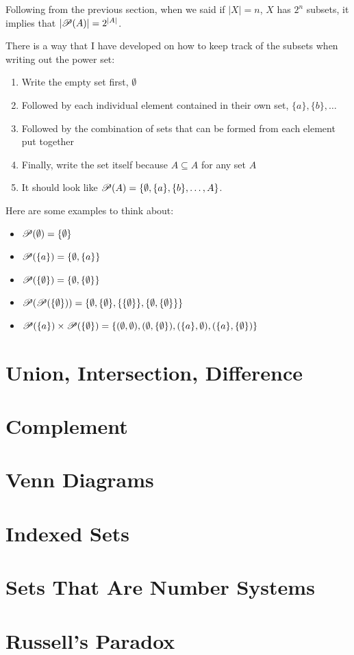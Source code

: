 \documentclass[../Latex-Setup/setup.tex]{subfiles}
\begin{document}
\indent Following from the previous section, when we said if $|X| = n$, $X$ has $2^n$ subsets,
it implies that $|\mathscr P(A)| = 2^{|A|}$.\par

\indent There is a way that I have developed on how to keep track of the subsets when writing out the power set:
\begin{enumerate}
    \item Write the empty set first, $\emptyset$
    \item Followed by each individual element contained in their own set, $\{a\}, \{b\}, \dots$
    \item Followed by the combination of sets that can be formed from each element put together
    \item Finally, write the set itself because $A \subseteq A$ for any set $A$
    \item It should look like $\mathscr P(A) = \{\emptyset, \{a\}, \{b\}, \dots, A\}$.
\end{enumerate}
\par

\begin{example}
    Here are some examples to think about:
    \begin{itemize}
        \item $\mathscr P(\emptyset)=\{\emptyset\}$
        \item $\mathscr P(\{a\})=\{\emptyset, \{a\}\}$
        \item $\mathscr P(\{\emptyset\}) = \{\emptyset, \{\emptyset\}\}$
        \item $\mathscr P(\mathscr P(\{\emptyset\}))=\{\emptyset, \{\emptyset\}, \{\{\emptyset\}\}, \{\emptyset, \{\emptyset\}\}\}$
        \item $\mathscr P(\{a\}) \times \mathscr P(\{\emptyset\}) = \{(\emptyset, \emptyset), (\emptyset, \{\emptyset\}), (\{a\}, \emptyset), (\{a\}, \{\emptyset\})\}$
    \end{itemize}
\end{example}


\section{Union, Intersection, Difference}
\section{Complement}
\section{Venn Diagrams}
\section{Indexed Sets}
\section{Sets That Are Number Systems}
\section{Russell's Paradox}
\end{document}
